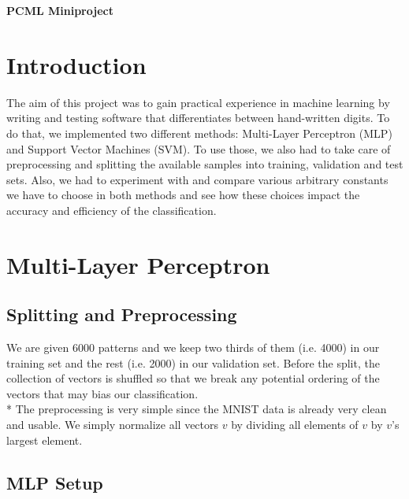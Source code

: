 \documentclass[10pt,a4paper,english]{article}
\begin{document}
\begin{center}
\huge{\textbf{PCML Miniproject}}
\end{center}

\section*{Introduction}

The aim of this project was to gain practical experience in machine learning by writing and testing software that differentiates between hand-written digits.
To do that, we implemented two different methods: Multi-Layer Perceptron (MLP) and Support Vector Machines (SVM). To use those, we also had to take care of preprocessing and splitting the available samples into training, validation and test sets. Also, we had to experiment with and compare various arbitrary constants we have to choose in both methods and see how these choices impact the accuracy and efficiency of the classification.

\section*{Multi-Layer Perceptron}

\subsection*{Splitting and Preprocessing}

We are given 6000 patterns and we keep two thirds of them (i.e. 4000) in our training set and the rest (i.e. 2000) in our validation set. Before the split, the collection of vectors is shuffled so that we break any potential ordering of the vectors that may bias our classification.\\*
The preprocessing is very simple since the MNIST data is already very clean and usable. We simply normalize all vectors $ v $ by dividing all elements of $ v $ by $ v $'s largest element.

\subsection*{MLP Setup}
\end{document}
